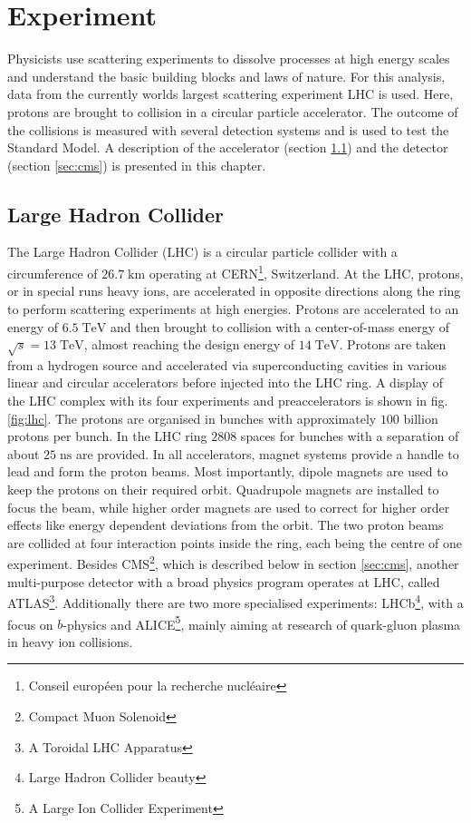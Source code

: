 \chapter{Experiment}
\label{ch:Exp}
	Physicists use scattering experiments to dissolve processes at high energy scales and understand the basic building blocks and laws of nature. For this analysis, data from the currently worlds largest scattering experiment LHC is used. Here, protons are brought to collision in a circular particle accelerator. The outcome of the collisions is measured with several detection systems and is used to test the Standard Model. A description of the accelerator (section \ref{sec:lhc}) and the detector (section \ref{sec:cms}) is presented in this chapter.
\section{Large Hadron Collider}
\label{sec:lhc}
	The Large Hadron Collider (LHC) is a circular particle collider with a circumference of $26.7\;\text{km}$ operating at CERN\footnote{Conseil europ\'{e}en pour la recherche nucl\'{e}aire}, Switzerland. At the LHC, protons, or in special runs heavy ions, are accelerated in opposite directions along the ring to perform scattering experiments at high energies. Protons are accelerated to an energy of $6.5\;\text{TeV}$ and then brought to collision with a center-of-mass energy of $\sqrt{s}=13\;\text{TeV}$, almost reaching the design energy of $14\;\text{TeV}$. Protons are taken from a hydrogen source and accelerated via superconducting cavities in various linear and circular accelerators before injected into the LHC ring. A display of the LHC complex with its four experiments and preaccelerators is shown in fig. \ref{fig:lhc}. The protons are organised in bunches with approximately $100$ billion protons per bunch. In the LHC ring $2808$ spaces for bunches with a separation of about $25\;\text{ns}$ are provided. In all accelerators, magnet systems provide a handle to lead and form the proton beams. Most importantly, dipole magnets are used to keep the protons on their required orbit. Quadrupole magnets are installed to focus the beam, while higher order magnets are used to correct for higher order effects like energy dependent deviations from the orbit. The two proton beams are collided at four interaction points inside the ring, each being the centre of one experiment. Besides CMS\footnote{Compact Muon Solenoid}, which is described below in section \ref{sec:cms},  another multi-purpose detector with a broad physics program operates at LHC, called ATLAS\footnote{A Toroidal LHC Apparatus}. Additionally there are two more specialised experiments: LHCb\footnote{Large Hadron Collider beauty}, with a focus on $b$-physics and ALICE\footnote{A Large Ion Collider Experiment}, mainly aiming at research of quark-gluon plasma in heavy ion collisions. \\
